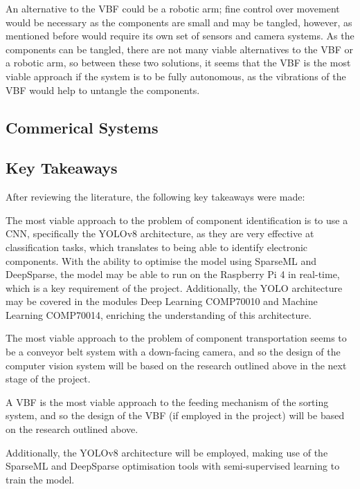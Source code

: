 An alternative to the VBF could be a robotic arm; fine control over movement would be necessary as the components are small and may be tangled, however, as mentioned before would require its own set of sensors and camera systems.
As the components can be tangled, there are not many viable alternatives to the VBF or a robotic arm, so between these two solutions, it seems that the VBF is the most viable approach if the system is to be fully autonomous, as the vibrations of the VBF would help to untangle the components.
\subsection{Commerical Systems}
\subsection{Key Takeaways}
After reviewing the literature, the following key takeaways were made:

The most viable approach to the problem of component identification is to use a CNN, specifically the YOLOv8 architecture, as they are very effective at classification tasks, which translates to being able to identify electronic components. With the ability
to optimise the model using SparseML and DeepSparse, the model may be able to run on the Raspberry Pi 4 in real-time, which is a key requirement of the project.
Additionally, the YOLO architecture may be covered in the modules Deep Learning COMP70010 and Machine Learning COMP70014, enriching the understanding of this architecture.

The most viable approach to the problem of component transportation seems to be a conveyor belt system with a down-facing camera, and so the design of the computer vision system will be based on the research outlined above in the next stage of the project.

A VBF is the most viable approach to the feeding mechanism of the sorting system, and so the design of the VBF (if employed in the project) will be based on the research outlined above.

Additionally, the YOLOv8 architecture will be employed, making use of the SparseML and DeepSparse optimisation tools with semi-supervised learning to train the model.
